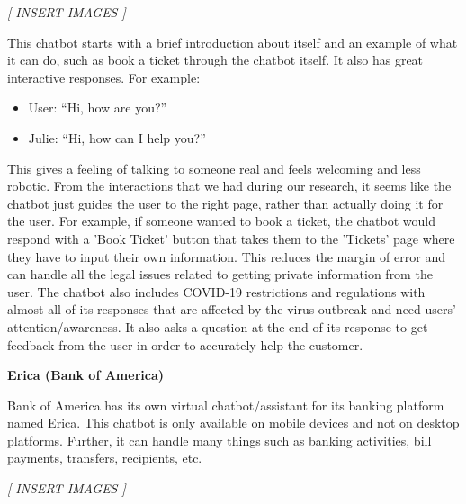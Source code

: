 \documentclass[titlepage, 12pt]{article}
\begin{document}
\begin{center}\emph{[ INSERT IMAGES ]}\end{center}

This chatbot starts with a brief introduction about itself and an example of what it can do, such as book a ticket through the chatbot itself. It also has great interactive responses. For example:

\begin{itemize}
    \item User: “Hi, how are you?”
    \item Julie: “Hi, how can I help you?”
\end{itemize}

This gives a feeling of talking to someone real and feels welcoming and less robotic. From the interactions that we had during our research, it seems like the chatbot just guides the user to the right page, rather than actually doing it for the user. For example, if someone wanted to book a ticket, the chatbot would respond with a 'Book Ticket' button that takes them to the 'Tickets' page where they have to input their own information. This reduces the margin of error and can handle all the legal issues related to getting private information from the user. The chatbot also includes COVID-19 restrictions and regulations with almost all of its responses that are affected by the virus outbreak and need users' attention/awareness. It also asks a question at the end of its response to get feedback from the user in order to accurately help the customer.

\textbf{Erica (Bank of America)}

Bank of America has its own virtual chatbot/assistant for its banking platform named Erica. This chatbot is only available on mobile devices and not on desktop platforms. Further, it can handle many things such as banking activities, bill payments, transfers, recipients, etc.

\begin{center}\emph{[ INSERT IMAGES ]}\end{center}
\end{document}
